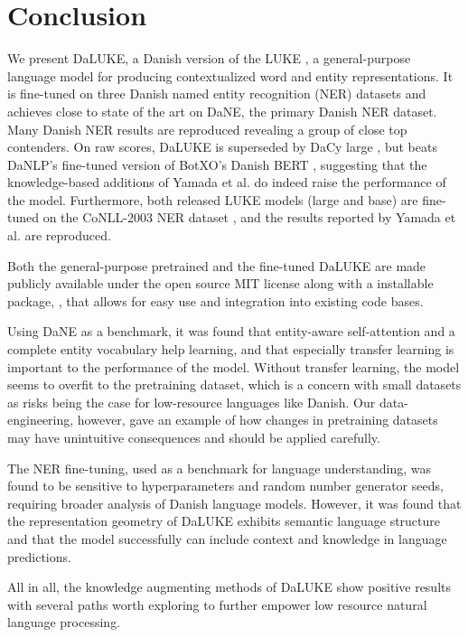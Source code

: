 \documentclass[main.tex]{subfiles}
\begin{document}
\chapter{Conclusion}
We present DaLUKE, a Danish version of the LUKE \cite{yamada2020luke}, a general-purpose language model for producing contextualized word and entity representations.
It is fine-tuned on three Danish named entity recognition (NER) datasets and achieves close to state of the art on DaNE, the primary Danish NER dataset.
Many Danish NER results are reproduced revealing a group of close top contenders.
On raw scores, DaLUKE is superseded by DaCy large \cite{enevoldsen2020dacy}, but beats DaNLP's fine-tuned version of BotXO's Danish BERT \cite{danlp2021, botxo2019dabert}, suggesting that the knowledge-based additions of Yamada et al. \cite{yamada2020luke} do indeed raise the performance of the model.
Furthermore, both released LUKE models (large and base) are fine-tuned on the CoNLL-2003 NER dataset \cite{tjang2003conll}, and the results reported by Yamada et al. are reproduced.

Both the general-purpose pretrained and the fine-tuned DaLUKE are made publicly available under the open source MIT license \cite{mitlicense} along with a  installable package, , that allows for easy use and integration into existing code bases.

Using DaNE as a benchmark, it was found that entity-aware self-attention and a complete entity vocabulary help learning, and that especially transfer learning is important to the performance of the model.
Without transfer learning, the model seems to overfit to the pretraining dataset, which is a concern with small datasets as risks being the case for low-resource languages like Danish.
Our data-engineering, however, gave an example of how changes in pretraining datasets may have unintuitive consequences and should be applied carefully.

The NER fine-tuning, used as a benchmark for language understanding, was found to be sensitive to hyperparameters and random number generator seeds, requiring broader analysis of Danish language models.
However, it was found that the representation geometry of DaLUKE exhibits semantic language structure and that the model successfully can include context and knowledge in language predictions.

All in all, the knowledge augmenting methods of DaLUKE show positive results with several paths worth exploring to further empower low resource natural language processing.
\end{document}
